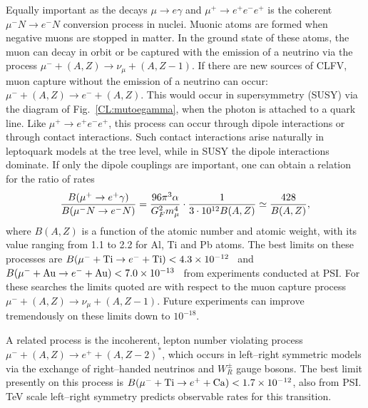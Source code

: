Equally important as the decays $\mu \rightarrow e\gamma$ and $\mu^+
\rightarrow e^+e^-e^+$ is the coherent $\mu^-N \rightarrow e^-N$ conversion
process in nuclei.  Muonic atoms are formed
when negative muons are stopped in matter.  In the ground state of these
atoms, the muon can decay in orbit or be captured with the emission of
a neutrino via the process $\mu^{-} + (A,Z) \rightarrow
\nu_{\mu} + (A,Z-1)$.  If there are new sources of CLFV, muon capture
without the emission of a neutrino can occur: $\mu^{-} + (A,Z)
\rightarrow e^{-} + (A,Z)$.   This would occur in supersymmetry (SUSY)  via
the diagram of Fig.~\ref{CL:mutoegamma}, when the photon is attached to
a quark line.  Like $\mu^+\rightarrow e^+e^-e^+$, this process can occur through dipole
interactions or through contact interactions.  Such contact
interactions arise naturally in leptoquark models at the tree level,
while in  SUSY the dipole interactions dominate.  If only the
dipole couplings are important, one can obtain a relation for the ratio of rates
\begin{equation}
\frac{B(\mu^{+}\rightarrow e^{+}\gamma)}
{B(\mu^{-}N\rightarrow e^{-}N)}
=\frac{96\pi^{3} \alpha}{G_F^2 m_{\mu}^4}\cdot
{1\over{3\cdot 10^{12}B(A,Z)}}\simeq \frac{428}{B(A,Z)},
\end{equation}
where $B(A,Z)$ is a function of the atomic number and atomic weight,
with its value ranging from 1.1 to 2.2 for Al, Ti and Pb atoms.  
The best limits on these processes are $B(\mu^- + {\rm Ti}
\rightarrow e^- + {\rm Ti}) < 4.3 \times 10^{-12}$~\cite{Dohmen:1993mp} and $B(\mu^- + {\rm Au}
\rightarrow e^- + {\rm Au}) < 7.0 \times 10^{-13}$~\cite{Bertl:2006up} from experiments conducted at PSI.
For these searches the limits quoted are with respect to the muon capture process $\mu^{-} + (A,Z) \rightarrow \nu_{\mu} + (A,Z-1)$.
Future
experiments can improve tremendously on these limits down to  $10^{-18}$.

A related process is the incoherent, lepton number violating
process $\mu^{-} + (A,Z) \rightarrow e^{+} + (A,Z-2)^{*}$, which
occurs in left--right symmetric models via the exchange of
right--handed neutrinos and $W_R^\pm$ gauge bosons.  The best limit
presently on this process is $B(\mu^- + {\rm Ti} \rightarrow
e^+ + {\rm Ca}) < 1.7 \times 10^{-12}$, also from PSI.  TeV scale
left--right symmetry predicts observable rates for this
transition.

